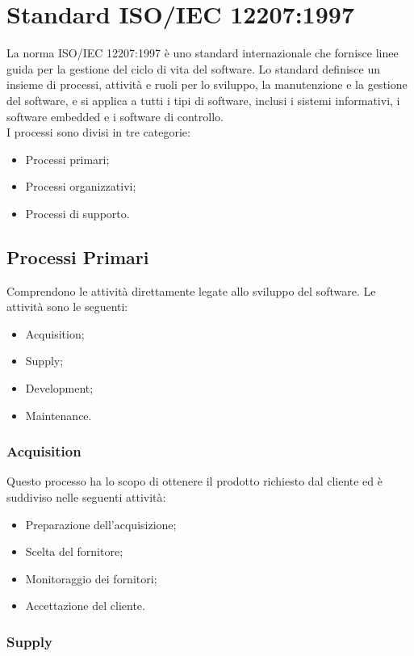 \section{Standard ISO/IEC 12207:1997}
La norma ISO/IEC 12207:1997 è uno standard internazionale che fornisce linee guida per la gestione del ciclo di vita del software. Lo standard definisce un insieme di processi, attività e ruoli per lo sviluppo, la manutenzione e la gestione del software, e si applica a tutti i tipi di software, inclusi i sistemi informativi, i software embedded e i software di controllo.\\
I processi sono divisi in tre categorie:
\begin{itemize}
\item Processi primari;
\item Processi organizzativi;
\item Processi di supporto.
\end{itemize}

\subsection{Processi Primari}
Comprendono le attività direttamente legate allo sviluppo del software.
Le attività sono le seguenti:
\begin{itemize}
\item Acquisition;
\item Supply;
\item Development;
\item Maintenance.
\end{itemize}

\subsubsection{Acquisition}
Questo processo ha lo scopo di ottenere il prodotto richiesto dal cliente ed è suddiviso nelle seguenti
attività:
\begin{itemize}
    \item Preparazione dell'acquisizione;
    \item Scelta del fornitore;
    \item Monitoraggio dei fornitori;
    \item Accettazione del cliente.
\end{itemize}

\subsubsection{Supply}

